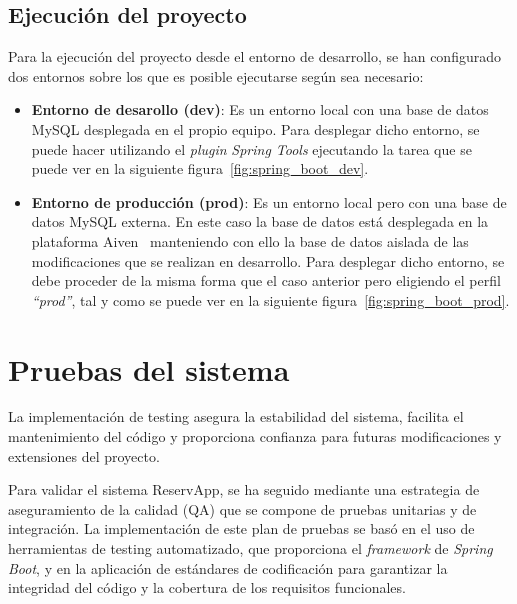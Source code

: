\subsection{Ejecución del proyecto}

Para la ejecución del proyecto desde el entorno de desarrollo, se han configurado dos entornos sobre los que es posible ejecutarse según sea necesario:
\begin{itemize}
   \item \textbf{Entorno de desarollo (dev)}: Es un entorno local con una base de datos MySQL desplegada en el propio equipo. Para desplegar dicho entorno, se puede hacer utilizando el \emph{plugin} \textit{Spring Tools} ejecutando la tarea que se puede ver en la siguiente figura~\ref{fig:spring_boot_dev}.

   
   \item \textbf{Entorno de producción (prod)}: Es un entorno local pero con una base de datos MySQL externa. En este caso la base de datos está desplegada en la plataforma Aiven~\cite{aiven} manteniendo con ello la base de datos aislada de las modificaciones que se realizan en desarrollo. Para desplegar dicho entorno, se debe proceder de la misma forma que el caso anterior pero eligiendo el perfil \emph{``prod''}, tal y como se puede ver en la siguiente figura~\ref{fig:spring_boot_prod}.

\end{itemize}

\section{Pruebas del sistema}
La implementación de testing asegura la estabilidad del sistema, facilita el mantenimiento del código y proporciona confianza para futuras modificaciones y extensiones del proyecto.

Para validar el sistema ReservApp, se ha seguido mediante una estrategia de aseguramiento de la calidad (QA) que se compone de pruebas unitarias y de integración. La implementación de este plan de pruebas se basó en el uso de herramientas de testing automatizado, que proporciona el \emph{framework} de \textit{Spring Boot}, y en la aplicación de estándares de codificación para garantizar la integridad del código y la cobertura de los requisitos funcionales.

